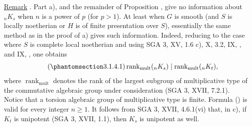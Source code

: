 \medskip
\noindent
\underline{Remark} .  Part  a), and the remainder of Proposition
, give no information about ${}_nK_s$ when $n$ is a power of $p$ (for
$p>1$).  At least when $G$ is smooth (and $S$ is locally noetherian or $H$
is of finite presentation over $S$), essentially the same method as in the
proof of a) gives such information.  Indeed, reducing to the case where
$S$ is complete local noetherian and using SGA 3, XV, 1.6 c), X, 3.2, IX,
, and IX, , one obtains
\begin{equation}\tag{\SGARefTarget{sga7.sga7i.eix.n3-1-4-1}{3.1.4.1}}
 \operatorname{rank}_{\mathrm{mult}}({}_nK_s)
 \mid
 \operatorname{rank}_{\mathrm{mult}}({}_nK_t),
\end{equation}
where $\operatorname{rank}_{\mathrm{mult}}$ denotes the rank of the largest
subgroup of multiplicative type of the commutative algebraic group under
consideration (SGA 3, XVII, 7.2.1).  Notice that a torsion algebraic group
of multiplicative type is finite.  Formula () is valid for every
integer $n\geq1$.  It follows from SGA 3, XVII, 4.6.1(vi) that, in c), if
$K_t$ is unipotent (SGA 3, XVII, 1.1), then $K_s$ is unipotent as well.
